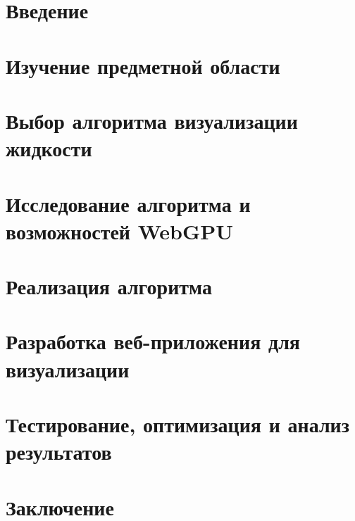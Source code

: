 \section*{Введение}

\newpage

\section{Изучение предметной области}

\section{Выбор алгоритма визуализации жидкости}

\section{Исследование алгоритма и возможностей WebGPU}

\section{Реализация алгоритма}

\section{Разработка веб-приложения для визуализации}

\section{Тестирование, оптимизация и анализ результатов}


\newpage
\section*{Заключение}
